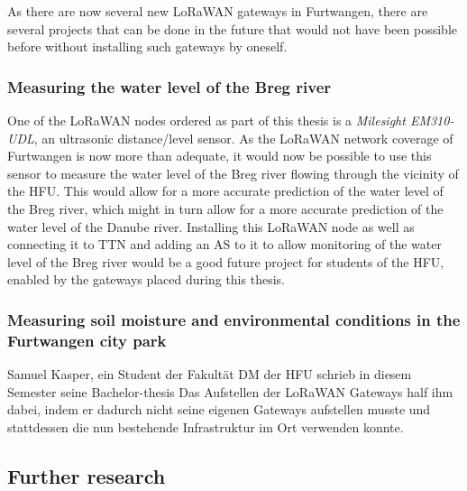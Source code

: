As there are now several new \ac{LoRaWAN} gateways in Furtwangen, there are several projects that can be done in the future that would not have been possible before without installing such gateways by oneself.

\subsubsection{Measuring the water level of the Breg river}

One of the \ac{LoRaWAN} nodes ordered as part of this thesis is a \emph{Milesight EM310-UDL}, an ultrasonic distance/level sensor.
As the \ac{LoRaWAN} network coverage of Furtwangen is now more than adequate, it would now be possible to use this sensor to measure the water level of the Breg river flowing through the vicinity of the \ac{HFU}.
This would allow for a more accurate prediction of the water level of the Breg river, which might in turn allow for a more accurate prediction of the water level of the Danube river.
Installing this \ac{LoRaWAN} node as well as connecting it to \ac{TTN} and adding an \acf{AS} to it to allow monitoring of the water level of the Breg river would be a good future project for students of the \ac{HFU}, enabled by the gateways placed during this thesis.

\subsubsection{Measuring soil moisture and environmental conditions in the Furtwangen city park}

Samuel Kasper, ein Student der Fakultät \ac{DM} der \ac{HFU} schrieb in diesem Semester seine Bachelor-thesis
Das Aufstellen der \ac{LoRaWAN} Gateways half ihm dabei, indem er dadurch nicht seine eigenen Gateways aufstellen musste und stattdessen die nun bestehende Infrastruktur im Ort verwenden konnte.

\subsection{Further research}

